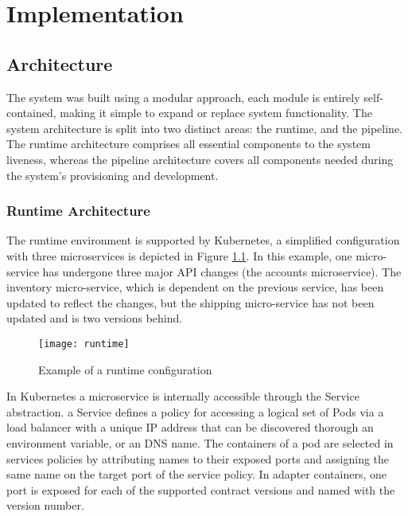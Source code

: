 
%

\chapter{Implementation}
\label{cha:implementation}

\section{Architecture} %
\label{sec:architecture}
The system was built using a modular approach,
each module is entirely self-contained, making it simple to expand or replace system functionality.
The system architecture is split into two distinct areas: the runtime, and the pipeline.
The runtime architecture comprises all essential components to the system liveness,
whereas the pipeline architecture covers all components needed during the system's provisioning and development.

\subsection{Runtime Architecture} %
\label{sec:runtime_architecture}

The runtime environment is supported by Kubernetes,
a simplified configuration with three microservices is depicted in Figure \ref{fig:runtime}.
In this example, one micro-service has undergone three major API changes (the accounts microservice).
The inventory micro-service, which is dependent on the previous service, has been updated to reflect the changes, but the shipping micro-service has not been updated and is two versions behind.

\begin{figure}[htbp]
    \centering
    \texttt{[image: runtime]}
    \caption{Example of a runtime configuration}
    \label{fig:runtime}
\end{figure}

In Kubernetes a microservice is internally accessible through the Service abstraction.
a Service defines a policy for accessing a logical set of Pods via a load balancer with a
unique IP address that can be discovered thorough an environment variable, or an DNS name.
The containers of a pod are selected in services policies by attributing names to their exposed ports and assigning the same name on the target port of the service policy.
In adapter containers, one port is exposed for each of the supported contract versions and named with the version number.

